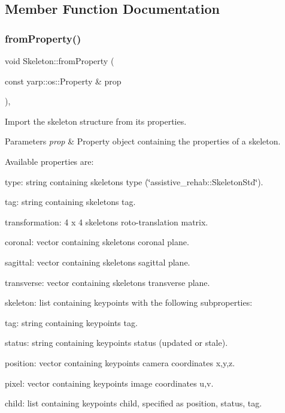\subsection{Member Function Documentation}
\mbox{\label{classassistive__rehab_1_1Skeleton_ac844f66503de87859833056dc33a835b}} 
\subsubsection{\texorpdfstring{fromProperty()}{fromProperty()}}
{\footnotesize\ttfamily void Skeleton\+::from\+Property (\begin{DoxyParamCaption}\item[{const yarp\+::os\+::\+Property \&}]{prop }\end{DoxyParamCaption})\hspace{0.3cm}{\ttfamily [virtual]}, {\ttfamily [inherited]}}



Import the skeleton structure from its properties. 


\begin{DoxyParams}{Parameters}
{\em prop} & Property object containing the properties of a skeleton.\\
\hline
\end{DoxyParams}
Available properties are\+:
\begin{DoxyItemize}
\item type\+: string containing skeleton\textquotesingle{}s type (\char`\"{}assistive\+\_\+rehab\+::\+Skeleton\+Std\char`\"{}).
\item tag\+: string containing skeleton\textquotesingle{}s tag.
\item transformation\+: 4 x 4 skeleton\textquotesingle{}s roto-\/translation matrix.
\item coronal\+: vector containing skeleton\textquotesingle{}s coronal plane.
\item sagittal\+: vector containing skeleton\textquotesingle{}s sagittal plane.
\item transverse\+: vector containing skeleton\textquotesingle{}s transverse plane.
\item skeleton\+: list containing keypoints with the following subproperties\+:
\begin{DoxyItemize}
\item tag\+: string containing keypoint\textquotesingle{}s tag.
\item status\+: string containing keypoint\textquotesingle{}s status (updated or stale).
\item position\+: vector containing keypoint\textquotesingle{}s camera coordinates x,y,z.
\item pixel\+: vector containing keypoint\textquotesingle{}s image coordinates u,v.
\item child\+: list containing keypoint\textquotesingle{}s child, specified as position, status, tag. 
\end{DoxyItemize}
\end{DoxyItemize}

